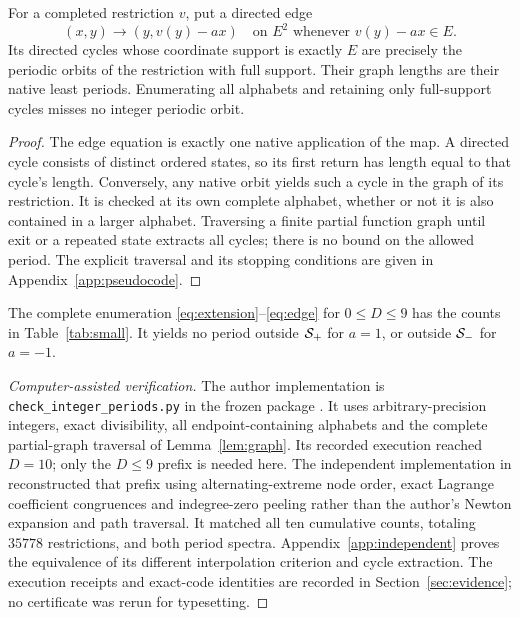 \begin{lemma}\label{lem:graph}
For a completed restriction $v$, put a directed edge
\begin{equation}\label{eq:edge}
 (x,y)\longrightarrow(y,v(y)-ax)
 \quad\text{on }E^2\text{ whenever }v(y)-ax\in E.
\end{equation}
Its directed cycles whose coordinate support is exactly $E$ are
precisely the periodic orbits of the restriction with full support.
Their graph lengths are their native least periods. Enumerating
all alphabets and retaining only full-support cycles misses no
integer periodic orbit.
\end{lemma}
\begin{proof}
The edge equation is exactly one native application of the map.
A directed cycle consists of distinct ordered states, so its first
return has length equal to that cycle's length. Conversely, any
native orbit yields such a cycle in the graph of its restriction.
It is checked at its own complete alphabet, whether or not it is
also contained in a larger alphabet. Traversing a finite partial
function graph until exit or a repeated state extracts all cycles;
there is no bound on the allowed period. The explicit traversal
and its stopping conditions are given in Appendix~\ref{app:pseudocode}.
\end{proof}

\begin{lemma}\label{lem:smallcertificate}
The complete enumeration \eqref{eq:extension}--\eqref{eq:edge}
for $0\le D\le9$ has the counts in Table~\ref{tab:small}.
It yields no period outside $\mathcal S_+$ for $a=1$, or outside $\mathcal S_-$
for $a=-1$.
\end{lemma}
\begin{proof}[Computer-assisted verification]
The author implementation is
\texttt{check\_integer\_periods.py} in the frozen package
\cite{IH6Working}. It uses arbitrary-precision integers, exact
divisibility, all endpoint-containing alphabets and the complete
partial-graph traversal of Lemma~\ref{lem:graph}. Its recorded
execution reached $D=10$; only the $D\le9$ prefix is needed here.
The independent implementation in \cite{IH6Review} reconstructed
that prefix using alternating-extreme node order, exact Lagrange
coefficient congruences and indegree-zero peeling rather than the
author's Newton expansion and path traversal. It matched all ten
cumulative counts, totaling $35778$ restrictions, and both period
spectra. Appendix~\ref{app:independent} proves the equivalence of
its different interpolation criterion and cycle extraction. The
execution receipts and exact-code identities are recorded in
Section~\ref{sec:evidence}; no certificate was rerun for typesetting.
\end{proof}

